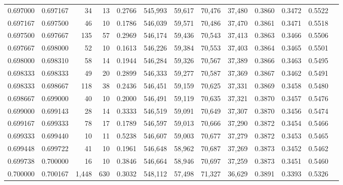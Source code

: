 \begin{tabular}{rrrrrrrrrrrrr}
0.697000 & 0.697167 &    34 &  13 &                                     0.2766 & 545,993 &  59,617 &  70,476 &  37,480 & 0.3860 & 0.3472 & 0.5522 \\
0.697167 & 0.697500 &    46 &  10 &                                     0.1786 & 546,039 &  59,571 &  70,486 &  37,470 & 0.3861 & 0.3471 & 0.5518 \\
0.697500 & 0.697667 &   135 &  57 &                                     0.2969 & 546,174 &  59,436 &  70,543 &  37,413 & 0.3863 & 0.3466 & 0.5506 \\
0.697667 & 0.698000 &    52 &  10 &                                     0.1613 & 546,226 &  59,384 &  70,553 &  37,403 & 0.3864 & 0.3465 & 0.5501 \\
0.698000 & 0.698310 &    58 &  14 &                                     0.1944 & 546,284 &  59,326 &  70,567 &  37,389 & 0.3866 & 0.3463 & 0.5495 \\
0.698333 & 0.698333 &    49 &  20 &                                     0.2899 & 546,333 &  59,277 &  70,587 &  37,369 & 0.3867 & 0.3462 & 0.5491 \\
0.698333 & 0.698667 &   118 &  38 &                                     0.2436 & 546,451 &  59,159 &  70,625 &  37,331 & 0.3869 & 0.3458 & 0.5480 \\
0.698667 & 0.699000 &    40 &  10 &                                     0.2000 & 546,491 &  59,119 &  70,635 &  37,321 & 0.3870 & 0.3457 & 0.5476 \\
0.699000 & 0.699143 &    28 &  14 &                                     0.3333 & 546,519 &  59,091 &  70,649 &  37,307 & 0.3870 & 0.3456 & 0.5474 \\
0.699167 & 0.699333 &    78 &  17 &                                     0.1789 & 546,597 &  59,013 &  70,666 &  37,290 & 0.3872 & 0.3454 & 0.5466 \\
0.699333 & 0.699440 &    10 &  11 &                                     0.5238 & 546,607 &  59,003 &  70,677 &  37,279 & 0.3872 & 0.3453 & 0.5465 \\
0.699448 & 0.699722 &    41 &  10 &                                     0.1961 & 546,648 &  58,962 &  70,687 &  37,269 & 0.3873 & 0.3452 & 0.5462 \\
0.699738 & 0.700000 &    16 &  10 &                                     0.3846 & 546,664 &  58,946 &  70,697 &  37,259 & 0.3873 & 0.3451 & 0.5460 \\
0.700000 & 0.700167 & 1,448 & 630 &                                     0.3032 & 548,112 &  57,498 &  71,327 &  36,629 & 0.3891 & 0.3393 & 0.5326 \\

\end{tabular}
